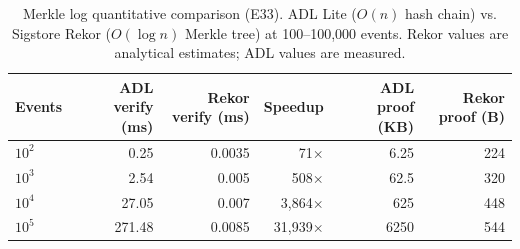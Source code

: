 \begin{table}[htbp]
\centering
\footnotesize
\caption{Merkle log quantitative comparison (E33). ADL Lite ($O(n)$ hash chain) vs. Sigstore Rekor ($O(\log n)$ Merkle tree) at 100--100,000 events. Rekor values are analytical estimates; ADL values are measured.}
\label{tab:e33-results}
\begin{tabular}{@{}lrrrrr@{}}
\toprule
\textbf{Events} & \textbf{ADL verify (ms)} & \textbf{Rekor verify (ms)} & \textbf{Speedup} & \textbf{ADL proof (KB)} & \textbf{Rekor proof (B)} \\
\midrule
$10^2$ & 0.25 & 0.0035 & 71$\times$ & 6.25 & 224 \\
$10^3$ & 2.54 & 0.005 & 508$\times$ & 62.5 & 320 \\
$10^4$ & 27.05 & 0.007 & 3,864$\times$ & 625 & 448 \\
$10^5$ & 271.48 & 0.0085 & 31,939$\times$ & 6250 & 544 \\
\bottomrule
\end{tabular}
\end{table}
